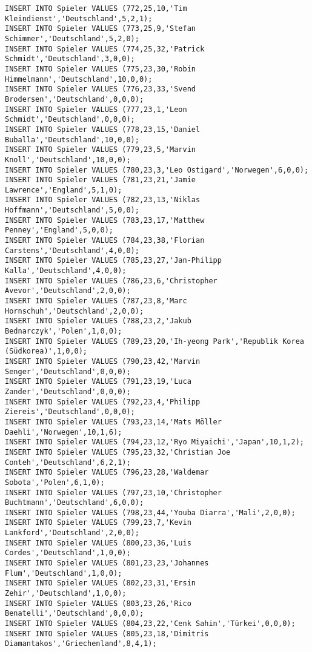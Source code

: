 \documentclass{bschlangaul-aufgabe}
\begin{document}
\begin{verbatim}
INSERT INTO Spieler VALUES (772,25,10,'Tim Kleindienst','Deutschland',5,2,1);
INSERT INTO Spieler VALUES (773,25,9,'Stefan Schimmer','Deutschland',5,2,0);
INSERT INTO Spieler VALUES (774,25,32,'Patrick Schmidt','Deutschland',3,0,0);
INSERT INTO Spieler VALUES (775,23,30,'Robin Himmelmann','Deutschland',10,0,0);
INSERT INTO Spieler VALUES (776,23,33,'Svend Brodersen','Deutschland',0,0,0);
INSERT INTO Spieler VALUES (777,23,1,'Leon Schmidt','Deutschland',0,0,0);
INSERT INTO Spieler VALUES (778,23,15,'Daniel Buballa','Deutschland',10,0,0);
INSERT INTO Spieler VALUES (779,23,5,'Marvin Knoll','Deutschland',10,0,0);
INSERT INTO Spieler VALUES (780,23,3,'Leo Ostigard','Norwegen',6,0,0);
INSERT INTO Spieler VALUES (781,23,21,'Jamie Lawrence','England',5,1,0);
INSERT INTO Spieler VALUES (782,23,13,'Niklas Hoffmann','Deutschland',5,0,0);
INSERT INTO Spieler VALUES (783,23,17,'Matthew Penney','England',5,0,0);
INSERT INTO Spieler VALUES (784,23,38,'Florian Carstens','Deutschland',4,0,0);
INSERT INTO Spieler VALUES (785,23,27,'Jan-Philipp Kalla','Deutschland',4,0,0);
INSERT INTO Spieler VALUES (786,23,6,'Christopher Avevor','Deutschland',2,0,0);
INSERT INTO Spieler VALUES (787,23,8,'Marc Hornschuh','Deutschland',2,0,0);
INSERT INTO Spieler VALUES (788,23,2,'Jakub Bednarczyk','Polen',1,0,0);
INSERT INTO Spieler VALUES (789,23,20,'Ih-yeong Park','Republik Korea (Südkorea)',1,0,0);
INSERT INTO Spieler VALUES (790,23,42,'Marvin Senger','Deutschland',0,0,0);
INSERT INTO Spieler VALUES (791,23,19,'Luca Zander','Deutschland',0,0,0);
INSERT INTO Spieler VALUES (792,23,4,'Philipp Ziereis','Deutschland',0,0,0);
INSERT INTO Spieler VALUES (793,23,14,'Mats Möller Daehli','Norwegen',10,1,6);
INSERT INTO Spieler VALUES (794,23,12,'Ryo Miyaichi','Japan',10,1,2);
INSERT INTO Spieler VALUES (795,23,32,'Christian Joe Conteh','Deutschland',6,2,1);
INSERT INTO Spieler VALUES (796,23,28,'Waldemar Sobota','Polen',6,1,0);
INSERT INTO Spieler VALUES (797,23,10,'Christopher Buchtmann','Deutschland',6,0,0);
INSERT INTO Spieler VALUES (798,23,44,'Youba Diarra','Mali',2,0,0);
INSERT INTO Spieler VALUES (799,23,7,'Kevin Lankford','Deutschland',2,0,0);
INSERT INTO Spieler VALUES (800,23,36,'Luis Cordes','Deutschland',1,0,0);
INSERT INTO Spieler VALUES (801,23,23,'Johannes Flum','Deutschland',1,0,0);
INSERT INTO Spieler VALUES (802,23,31,'Ersin Zehir','Deutschland',1,0,0);
INSERT INTO Spieler VALUES (803,23,26,'Rico Benatelli','Deutschland',0,0,0);
INSERT INTO Spieler VALUES (804,23,22,'Cenk Sahin','Türkei',0,0,0);
INSERT INTO Spieler VALUES (805,23,18,'Dimitris Diamantakos','Griechenland',8,4,1);

\end{verbatim}
\end{document}
